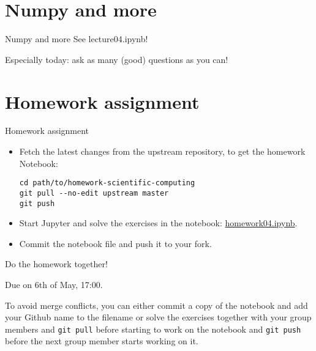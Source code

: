 \section{Numpy and more}
\begin{frame}[fragile]{Numpy and more}
    See lecture04.ipynb!

    \bigskip
    Especially today: ask as many (good) questions as you can!
\end{frame}


\section{Homework assignment}
\begin{frame}[fragile]{Homework assignment}
	\begin{itemize}
		\item Fetch the latest changes from the upstream repository, to get the homework Notebook:
            {\scriptsize
            \begin{verbatim}
cd path/to/homework-scientific-computing
git pull --no-edit upstream master
git push\end{verbatim}
            }
        \item Start Jupyter and solve the exercises in the notebook:
            \href{https://github.com/inwe-boku/homework-scientific-computing/blob/master/homework04-python-scientific-ecosystem//homework04.ipynb}{homework04.ipynb}.
        \item Commit the notebook file and push it to your fork.
	\end{itemize}

    \bigskip
    Do the homework together!

    \bigskip
    Due on 6th of May, 17:00.

    \bigskip
    To avoid merge conflicts, you can either commit a copy of the notebook and add your Github name
    to the filename or solve the exercises together with your group members and \verb|git pull|
    before starting to work on the notebook and \verb|git push| before the next group member starts
    working on it.
\end{frame}


